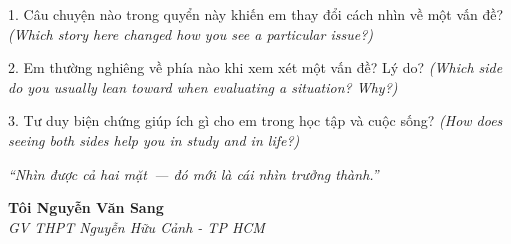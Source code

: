 \begin{tcolorbox}[
  colback=truyengold!10, colframe=truyengold!70!black,
  coltitle=black, fonttitle=\bfseries,
  title={T\textit{ự} H\textit{ọ}c Nhanh},
  arc=4pt, boxrule=1pt, breakable, enhanced
]
1. Câu chuyện nào trong quyển này khiến em thay đổi cách nhìn về một vấn đề? \textit{(Which story here changed how you see a particular issue?)}

2. Em thường nghiêng về phía nào khi xem xét một vấn đề? Lý do? \textit{(Which side do you usually lean toward when evaluating a situation? Why?)}

3. Tư duy biện chứng giúp ích gì cho em trong học tập và cuộc sống? \textit{(How does seeing both sides help you in study and in life?)}
\end{tcolorbox}

\begin{center}
\textit{\color{truyengold}``Nhìn được cả hai mặt~--- đó mới là cái nhìn trưởng thành.''}
\end{center}

\begin{flushright}
\textbf{Tôi Nguyễn Văn Sang}\\
\textit{GV THPT Nguyễn Hữu Cảnh - TP HCM}
\end{flushright}

\ngancach
